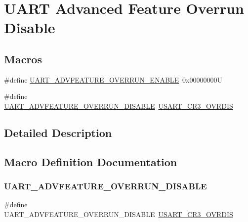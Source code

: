 \hypertarget{group___u_a_r_t___overrun___disable}{}\section{U\+A\+RT Advanced Feature Overrun Disable}
\label{group___u_a_r_t___overrun___disable}
\subsection*{Macros}
\begin{DoxyCompactItemize}
\item 
\#define \mbox{\hyperlink{group___u_a_r_t___overrun___disable_gac467cc43fa4c3af4acb0fd161061c219}{U\+A\+R\+T\+\_\+\+A\+D\+V\+F\+E\+A\+T\+U\+R\+E\+\_\+\+O\+V\+E\+R\+R\+U\+N\+\_\+\+E\+N\+A\+B\+LE}}~0x00000000U
\item 
\#define \mbox{\hyperlink{group___u_a_r_t___overrun___disable_ga19961cd52b746dac7a6860faad2ab40d}{U\+A\+R\+T\+\_\+\+A\+D\+V\+F\+E\+A\+T\+U\+R\+E\+\_\+\+O\+V\+E\+R\+R\+U\+N\+\_\+\+D\+I\+S\+A\+B\+LE}}~\mbox{\hyperlink{group___peripheral___registers___bits___definition_ga33d63c7953788124179cd18a8890a91a}{U\+S\+A\+R\+T\+\_\+\+C\+R3\+\_\+\+O\+V\+R\+D\+IS}}
\end{DoxyCompactItemize}


\subsection{Detailed Description}


\subsection{Macro Definition Documentation}
\mbox{\label{group___u_a_r_t___overrun___disable_ga19961cd52b746dac7a6860faad2ab40d}} 
\subsubsection{\texorpdfstring{UART\_ADVFEATURE\_OVERRUN\_DISABLE}{UART\_ADVFEATURE\_OVERRUN\_DISABLE}}
{\footnotesize\ttfamily \#define U\+A\+R\+T\+\_\+\+A\+D\+V\+F\+E\+A\+T\+U\+R\+E\+\_\+\+O\+V\+E\+R\+R\+U\+N\+\_\+\+D\+I\+S\+A\+B\+LE~\mbox{\hyperlink{group___peripheral___registers___bits___definition_ga33d63c7953788124179cd18a8890a91a}{U\+S\+A\+R\+T\+\_\+\+C\+R3\+\_\+\+O\+V\+R\+D\+IS}}}


